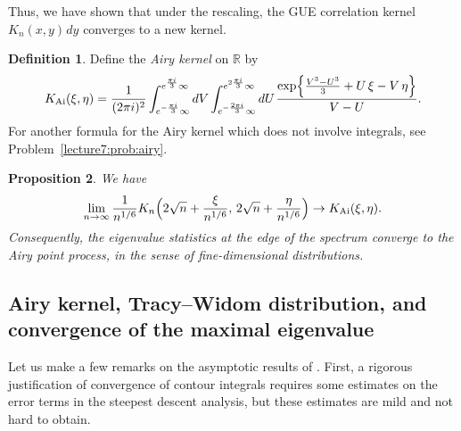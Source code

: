 \documentclass[letterpaper,11pt,oneside,reqno]{book}
\numberwithin{equation}{chapter}  %
\newcommand{\ssp}{\hspace{1pt}}
\newtheorem{proposition}{Proposition}[chapter]  %
\theoremstyle{definition}
\newtheorem{definition}[proposition]{Definition}
\begin{document}
Thus, we have shown that under the rescaling, the GUE correlation kernel
$K_n(x,y)\ssp dy$ converges to a new kernel.
\begin{definition}
	\label{lecture7:def:Airy_kernel}
	Define the \emph{Airy kernel} on $\mathbb{R}$ by
	\begin{equation*}
		K_{\mathrm{Ai}}(\xi,\eta)=\frac{1}{(2\pi i)^2}
		\int_{e^{-\frac{\pi i}{3}}\infty}^{e^{\frac{\pi i}{3}}\infty}dV
		\int_{e^{-\frac{2\pi i}{3}}\infty}^{e^{2\frac{\pi i}{3}}\infty}dU
		\ssp
		\frac{\exp\Bigl\{\frac{V^3-U^3}{3}+U\,\xi-V\,\eta\Bigr\}}{V-U}.
	\end{equation*}
	For another formula for the Airy kernel
	which does not involve integrals,
	see
	Problem~\ref{lecture7:prob:airy}.
\end{definition}

\begin{proposition}
	\label{lecture7:prop:edge}
	We have
	\begin{equation*}
		\lim_{n\to\infty}
		\frac{1}{n^{1/6}}K_n\Bigl(2\sqrt{n}+\frac{\xi}{n^{1/6}},\,2\sqrt{n}+\frac{\eta}{n^{1/6}}\Bigr)
		\to
		K_{\mathrm{Ai}}(\xi,\eta).
	\end{equation*}
	Consequently, the eigenvalue statistics at the edge of the spectrum converge to the Airy point process, in the sense of fine-dimensional distributions.
\end{proposition}

\subsection{Airy kernel, Tracy--Widom distribution, and convergence of the maximal
eigenvalue}

Let us make a few remarks on the asymptotic results of
.
First,
a rigorous justification of convergence
of contour integrals requires some estimates on the error terms
in the steepest descent analysis, but these
estimates are mild and not hard to obtain.
\end{document}
